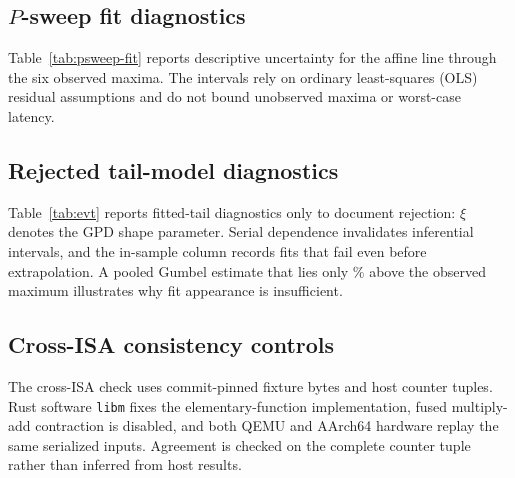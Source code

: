 \subsection{\texorpdfstring{$P$}{P}-sweep fit diagnostics}
\label{app:psweep-fit}
Table~\ref{tab:psweep-fit} reports descriptive uncertainty for the affine line through the
six observed maxima. The intervals rely on ordinary least-squares (OLS) residual assumptions and
do not bound unobserved maxima or worst-case latency.


\subsection{Rejected tail-model diagnostics}
\label{app:evt}
Table~\ref{tab:evt} reports fitted-tail diagnostics only to document rejection: $\xi$
denotes the GPD shape parameter. Serial dependence invalidates inferential intervals, and the
in-sample column records fits that fail even before extrapolation. A pooled Gumbel estimate that lies only
\evtGumbelExtraPct\% above the observed maximum illustrates why fit appearance is insufficient.


\subsection{Cross-ISA consistency controls}
\label{app:crossisa-controls}
The cross-ISA check uses commit-pinned fixture bytes and host counter tuples. Rust
software \texttt{libm} fixes the elementary-function implementation, fused multiply-add
contraction is disabled, and both QEMU and AArch64 hardware replay the same serialized
inputs. Agreement is checked on the complete counter tuple rather than inferred from host
results.
